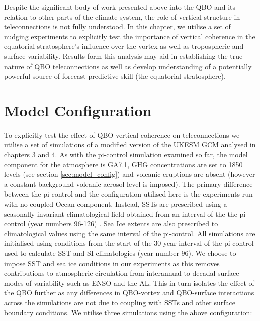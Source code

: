 Despite the significant body of work presented above into the QBO and its relation to other parts of the climate system, the role of vertical structure in teleconnections is not fully understood. In this chapter, we utilise a set of nudging experiments to explicitly test the importance of vertical coherence in the equatorial stratosphere's influence over the vortex as well as tropospheric and surface variability. Results form this analysis may aid in establishing the true nature of QBO teleconnections as well as develop understanding of a potentially powerful source of forecast predictive skill (the equatorial stratosphere).

\section{Model Configuration}

To explicitly test the effect of QBO vertical coherence on teleconnections we utilise a set of simulations of a modified version of the UKESM GCM analysed in chapters 3 and 4. As with the pi-control simulation examined so far, the model component for the atmosphere is GA7.1, GHG concentrations are set to 1850 levels (see section \ref{sec:model_config}) and volcanic eruptions are absent (however a constant background volcanic aerosol level is imposed). The primary difference between the pi-control and the configuration utilised here is the experiments run with no coupled Ocean component. Instead, SSTs are prescribed using a seasonally invariant climatological field obtained from an interval of the the pi-control (year numbers 96-126) \cite{oconnorAssessment2021}. Sea Ice extents are also prescribed to climatological values using the same interval of the pi-control. All simulations are initialised using conditions from the start of the 30 year interval of the pi-control used to calculate SST and SI climatologies (year number 96). We choose to impose SST and sea ice conditions in our experiments as this removes contributions to atmospheric circulation from interannual to decadal surface modes of variability such as ENSO and the AL. This in turn isolates the effect of the QBO further as any differences in QBO-vortex and QBO-surface interactions across the simulations are not due to coupling with SSTs and other surface boundary conditions. We utilise three simulations using the above configuration:

